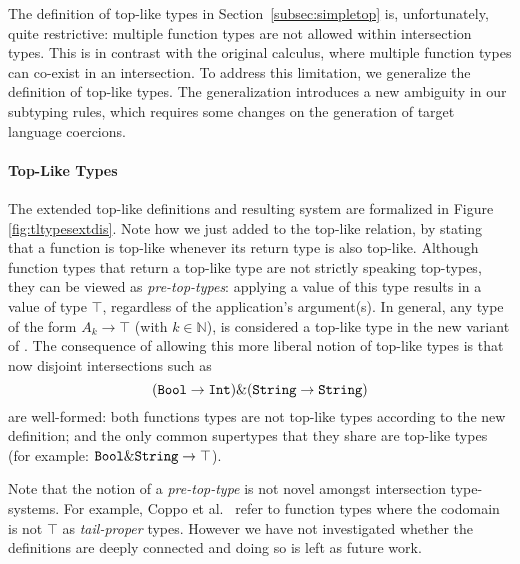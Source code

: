 The definition of top-like types in Section~\ref{subsec:simpletop} is,
unfortunately, quite restrictive: multiple function types are not allowed
within intersection types. This is in contrast with the original \name
calculus, where multiple function types can co-exist in an
intersection. To address this limitation, we generalize the definition
of top-like types. The generalization introduces a new ambiguity in
our subtyping rules, which requires some changes on the generation of target
language coercions.

\paragraph{Top-Like Types}
The extended top-like definitions and resulting system are formalized
in Figure \ref{fig:tltypesextdis}.  Note how we just added
 to the top-like relation, by stating that a
function is top-like whenever its return type is also
top-like. Although function types that return a top-like type are not
strictly speaking top-types, they can be viewed as \emph{pre-top-types}: 
applying a value of this type results in a value of type $\top$, regardless of 
the application's argument(s).  In general, any type of the
form $A_k \to \top$ (with $k \in \mathbb{N}$), is considered a
top-like type in the new variant of \name. The consequence of allowing 
this more liberal notion of top-like types is that now disjoint
intersections such as \[ (\texttt{Bool} \to \texttt{Int}) \& (\texttt{String} \to \texttt{String}) \]
are well-formed: both functions types are not top-like types according
to the new definition; and the only common supertypes that they share
are top-like types (for example: $\texttt{Bool}\&\texttt{String} \to \texttt{$\top$}$).

Note that the notion of a \emph{pre-top-type} is not novel amongst 
intersection type-systems. For example, Coppo et al.~\cite{coppo1981functional}
refer to function types where the codomain is not $\top$ as \emph{tail-proper} types.
However we have not investigated whether the definitions are deeply connected 
and doing so is left as future work. 


